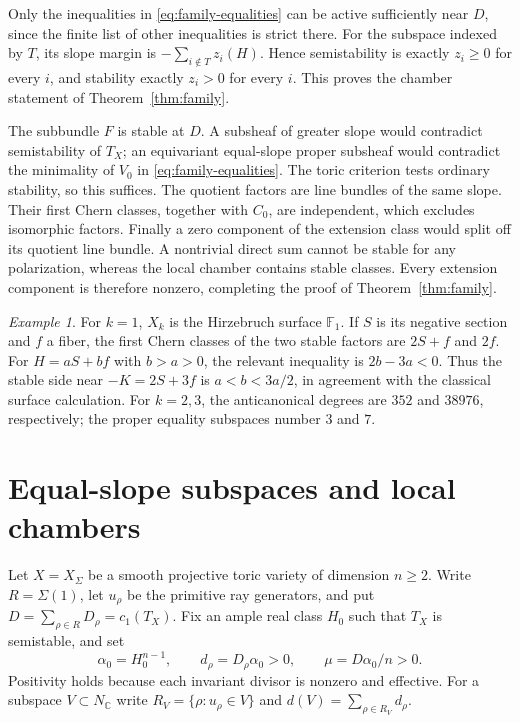 \documentclass[11pt]{amsart}
\theoremstyle{definition}
\theoremstyle{remark}
\newtheorem{example}[theorem]{Example}
\newcommand{\CC}{\mathbb C}
\begin{document}
Only the inequalities in \eqref{eq:family-equalities} can be active
sufficiently near $D$, since the finite list of other inequalities is
strict there. For the subspace indexed by $T$, its slope margin is
$-\sum_{i\notin T}z_i(H)$. Hence semistability is exactly $z_i\ge0$
for every $i$, and stability exactly $z_i>0$ for every $i$. This proves
the chamber statement of Theorem~\ref{thm:family}.

The subbundle $F$ is stable at $D$. A subsheaf of greater slope would
contradict semistability of $T_X$; an equivariant equal-slope proper
subsheaf would contradict the minimality of $V_0$ in
\eqref{eq:family-equalities}. The toric criterion tests ordinary
stability, so this suffices. The quotient factors are line bundles of
the same slope. Their first Chern classes, together with $C_0$, are
independent, which excludes isomorphic factors. Finally a zero
component of the extension class would split off its quotient line
bundle. A nontrivial direct sum cannot be stable for any polarization,
whereas the local chamber contains stable classes. Every extension
component is therefore nonzero, completing the proof of
Theorem~\ref{thm:family}.

\begin{example}
For $k=1$, $X_k$ is the Hirzebruch surface $\mathbb F_1$. If $S$ is
its negative section and $f$ a fiber, the first Chern classes of the two
stable factors are
$2S+f$ and $2f$. For $H=aS+bf$ with $b>a>0$, the relevant inequality
is $2b-3a<0$. Thus the stable side near $-K=2S+3f$ is
$a<b<3a/2$, in agreement with the classical surface calculation.
For $k=2,3$, the anticanonical degrees are $352$ and $38976$,
respectively; the proper equality subspaces number $3$ and $7$.
\end{example}

\section{Equal-slope subspaces and local chambers}
\label{sec:general}

Let $X=X_\Sigma$ be a smooth projective toric variety of dimension
$n\ge2$. Write $R=\Sigma(1)$, let $u_\rho$ be the primitive ray
generators, and put $D=\sum_{\rho\in R}D_\rho=c_1(T_X)$.
Fix an ample real class $H_0$ such that $T_X$ is semistable, and set
\[
 \alpha_0=H_0^{n-1},\qquad d_\rho=D_\rho\alpha_0>0,
 \qquad\mu=D\alpha_0/n>0.
\]
Positivity holds because each invariant divisor is nonzero and effective.
For a subspace $V\subset N_\CC$ write
$R_V=\{\rho:u_\rho\in V\}$ and $d(V)=\sum_{\rho\in R_V}d_\rho$.
\end{document}
